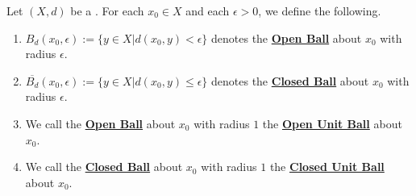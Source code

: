 \label{def:pseudometricball}
\newcommand{\OpenBall}[0]{\textbf{\hyperref[def:pseudometricball]{Open Ball}}\xspace}
\newcommand{\OpenUnitBall}[0]{\textbf{\hyperref[def:pseudometricball]{Open Unit Ball}}\xspace} 
\newcommand{\ClosedBall}[0]{\textbf{\hyperref[def:pseudometricball]{Closed Ball}}\xspace}
\newcommand{\ClosedUnitBall}[0]{\textbf{\hyperref[def:pseudometricball]{Closed  Unit Ball}}\xspace}
\begin{df}
    Let $(X,d)$ be a \PseudometricSpace. 
    For each $x_0  \in X$ and each $\epsilon > 0$, we define the following.
    \begin{enumerate}
        \item  $B_d(x_0, \epsilon) := \{y \in X | d(x_0,y) < \epsilon\}$ denotes the \OpenBall about $x_0$ with radius $\epsilon$. 
    \item $\overline{B_d}(x_0,\epsilon) := \{y \in X | d(x_0,y) \leq \epsilon \}$ denotes the \ClosedBall about $x_0$ with radius $\epsilon$. 
    \item  We call the \OpenBall about $x_0$ with radius $1$ the \OpenUnitBall about $x_0$. 
    \item We call the \ClosedBall about $x_0$ with radius $1$ the \ClosedUnitBall about $x_0$. 
    \end{enumerate} 
    \end{df} 
